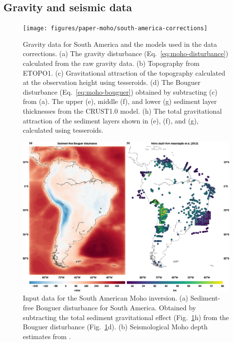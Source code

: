 \subsection{Gravity and seismic data}

\begin{figure}
    \centering
    \texttt{[image: figures/paper-moho/south-america-corrections]}
    \caption{
        Gravity data for South America and the models used in the data
        corrections.
        (a) The gravity disturbance (Eq.~\ref{eq:moho-disturbance}) calculated from
        the raw gravity data.
        (b) Topography from ETOPO1.
        (c) Gravitational attraction of the topography calculated
        at the observation height using tesseroids.
        (d) The Bouguer disturbance (Eq.~\ref{eq:moho-bouguer}) obtained by
        subtracting (c) from (a).
        The upper (e), middle (f), and lower (g) sediment layer thicknesses
        from the CRUST1.0 model.
        (h) The total gravitational attraction of the sediment layers shown in
        (e), (f), and (g), calculated using tesseroids.
        }
    \label{fig:moho-sam-corrections}
\end{figure}

\begin{figure}
    \centering
    \includegraphics[width=\textwidth]{figures/paper-moho/south-america-data}
    \caption{
        Input data for the South American Moho inversion.
        (a) Sediment-free Bouguer disturbance for South America.
        Obtained by subtracting the total sediment gravitational effect
        (Fig.~\ref{fig:moho-sam-corrections}h) from the Bouguer disturbance
        (Fig.~\ref{fig:moho-sam-corrections}d).
        (b) Seismological Moho depth estimates from
        \citet{assumpcao2013a}.
    }
    \label{fig:moho-sam-data}
\end{figure}


